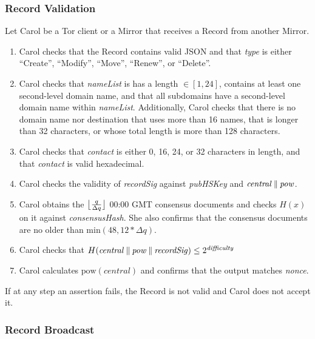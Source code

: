 \subsubsection{Record Validation}

Let Carol be a Tor client or a Mirror that receives a Record from another Mirror.

\begin{enumerate}
	\item Carol checks that the Record contains valid JSON and that \emph{type} is either ``Create'', ``Modify'', ``Move'', ``Renew'', or ``Delete''.
	\item Carol checks that \emph{nameList} is has a length $ \in [1,24] $, contains at least one second-level domain name, and that all subdomains have a second-level domain name within \emph{nameList}. Additionally, Carol checks that there is no domain name nor destination that uses more than 16 names, that is longer than 32 characters, or whose total length is more than 128 characters.
	\item Carol checks that \emph{contact} is either 0, 16, 24, or 32 characters in length, and that \emph{contact} is valid hexadecimal.
	\item Carol checks the validity of \emph{recordSig} against \emph{pubHSKey} and $ \mathit{central} \concat \mathit{pow} $.
	\item Carol obtains the $ \floor[\big]{\frac{q}{\Delta q}} $ 00:00 GMT consensus documents and checks $ H(x) $ on it against \emph{consensusHash}. She also confirms that the consensus documents are no older than $ \mathrm{min}(48, 12 * \Delta q) $.
	\item Carol checks that $ H(\mathit{central} \concat \mathit{pow} \concat \mathit{recordSig}) \leq 2^{\mathit{difficulty}} $
	\item Carol calculates $ \mathrm{pow}(\mathit{central}) $ and confirms that the output matches \emph{nonce}.
\end{enumerate}

If at any step an assertion fails, the Record is not valid and Carol does not accept it.

\subsubsection{Record Broadcast}

